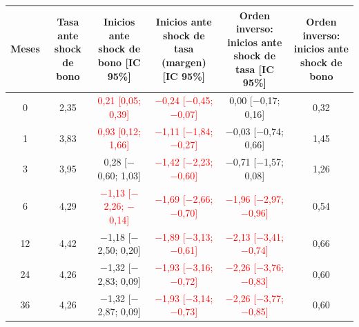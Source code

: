 \begin{tabular}{cccccc}
\toprule
Meses & Tasa ante shock de bono & Inicios ante shock de bono [IC 95\%] & Inicios ante shock de tasa (margen) [IC 95\%] & Orden inverso: inicios ante shock de tasa [IC 95\%] & Orden inverso: inicios ante shock de bono
\\ \midrule
0 & 2{,}35 & \textcolor{red}{0{,}21 [0{,}05; 0{,}39]} & \textcolor{red}{\ensuremath{-}0{,}24 [\ensuremath{-}0{,}45; \ensuremath{-}0{,}07]} & 0{,}00 [\ensuremath{-}0{,}17; 0{,}16] & 0{,}32 \\
1 & 3{,}83 & \textcolor{red}{0{,}93 [0{,}12; 1{,}66]} & \textcolor{red}{\ensuremath{-}1{,}11 [\ensuremath{-}1{,}84; \ensuremath{-}0{,}27]} & \ensuremath{-}0{,}03 [\ensuremath{-}0{,}74; 0{,}66] & 1{,}45 \\
3 & 3{,}95 & 0{,}28 [\ensuremath{-}0{,}60; 1{,}03] & \textcolor{red}{\ensuremath{-}1{,}42 [\ensuremath{-}2{,}23; \ensuremath{-}0{,}60]} & \ensuremath{-}0{,}71 [\ensuremath{-}1{,}57; 0{,}08] & 1{,}26 \\
6 & 4{,}29 & \textcolor{red}{\ensuremath{-}1{,}13 [\ensuremath{-}2{,}26; \ensuremath{-}0{,}14]} & \textcolor{red}{\ensuremath{-}1{,}69 [\ensuremath{-}2{,}66; \ensuremath{-}0{,}70]} & \textcolor{red}{\ensuremath{-}1{,}96 [\ensuremath{-}2{,}97; \ensuremath{-}0{,}96]} & 0{,}54 \\
12 & 4{,}42 & \ensuremath{-}1{,}18 [\ensuremath{-}2{,}50; 0{,}20] & \textcolor{red}{\ensuremath{-}1{,}89 [\ensuremath{-}3{,}13; \ensuremath{-}0{,}61]} & \textcolor{red}{\ensuremath{-}2{,}13 [\ensuremath{-}3{,}41; \ensuremath{-}0{,}74]} & 0{,}66 \\
24 & 4{,}26 & \ensuremath{-}1{,}32 [\ensuremath{-}2{,}83; 0{,}09] & \textcolor{red}{\ensuremath{-}1{,}93 [\ensuremath{-}3{,}16; \ensuremath{-}0{,}72]} & \textcolor{red}{\ensuremath{-}2{,}26 [\ensuremath{-}3{,}76; \ensuremath{-}0{,}83]} & 0{,}60 \\
36 & 4{,}26 & \ensuremath{-}1{,}32 [\ensuremath{-}2{,}87; 0{,}09] & \textcolor{red}{\ensuremath{-}1{,}93 [\ensuremath{-}3{,}14; \ensuremath{-}0{,}73]} & \textcolor{red}{\ensuremath{-}2{,}26 [\ensuremath{-}3{,}77; \ensuremath{-}0{,}85]} & 0{,}60 \\
\bottomrule
\end{tabular}
